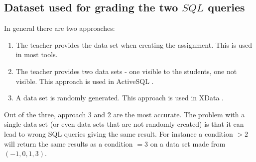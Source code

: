 \subsection{Dataset used for grading the two $SQL$ queries}
In general there are two approaches:
\begin{enumerate}
    \item The teacher provides the data set when creating the assignment. This
    is used in most tools.
    \item The teacher provides two data sets - one visible to the students, one
    not visible. This approach is used in ActiveSQL \cite{literature:activesql}.
    \item A data set is randomly generated. This approach is used in XData
    \cite{literature:xdata}.
\end{enumerate}

Out of the three, approach 3 and 2 are the most accurate. The problem with a single
data set (or even data sets that are not randomly created)
is that it can lead to wrong SQL queries giving the same result. For instance
a condition $> 2$ will return the same results as a condition $ = 3$ on a data set
made from $(-1, 0, 1, 3)$.
